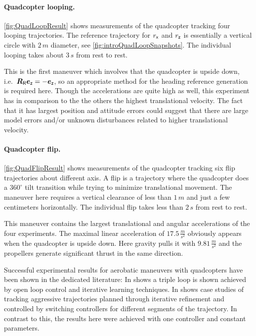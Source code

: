 \paragraph{Quadcopter looping.}
\autoref{fig:QuadLoopResult} shows measurements of the quadcopter tracking four looping trajectories.
The reference trajectory for $r_{\mathsf{x}}$ and $r_{\mathsf{z}}$ is essentially a vertical circle with $2\,\unit{m}$ diameter, see \autoref{fig:introQuadLoopSnapshots}.
The individual looping takes about $3\,\unit{s}$ from rest to rest.

This is the first maneuver which involves that the quadcopter is upside down, i.e.\ $\boldsymbol{R}_{\mathsf{R}} \boldsymbol{e}_{\mathsf{z}} = -\boldsymbol{e}_{\mathsf{z}}$, so an appropriate method for the heading reference generation is required here.
Though the accelerations are quite high as well, this experiment has in comparison to the the others the highest translational velocity.
The fact that it has largest position and attitude errors could suggest that there are large model errors and/or unknown disturbances related to higher translational velocity.


\paragraph{Quadcopter flip.}
\autoref{fig:QuadFlipResult} shows measurements of the quadcopter tracking six flip trajectories about different axis.
A flip is a trajectory where the quadcopter does a $360^\circ$ tilt transition while trying to minimize translational movement.
The maneuver here requires a vertical clearance of less than $1\,\unit{m}$ and just a few centimeters horizontally.
The individual flip takes less than $2\,\unit{s}$ from rest to rest.

This maneuver contains the largest translational and angular accelerations of the four experiments.
The maximal linear acceleration of $17.5\,\tfrac{\unit{m}}{\unit{s}^2}$ obviously appears when the quadcopter is upside down.
Here gravity pulls it with $9.81\,\tfrac{\unit{m}}{\unit{s}^2}$ and the propellers generate significant thrust in the same direction.

Successful experimental results for aerobatic maneuvers with quadcopters have been shown in the dedicated literature:
In \cite{Lupashin:QuadrocopterMultiFlips} shows a triple loop is shown achieved by open loop control and iterative learning techniques.
In \cite{MellingerIJRR12} shows case studies of tracking aggressive trajectories planned through iterative refinement and controlled by switching controllers for different segments of the trajectory.
In contrast to this, the results here were achieved with one controller and constant parameters.

